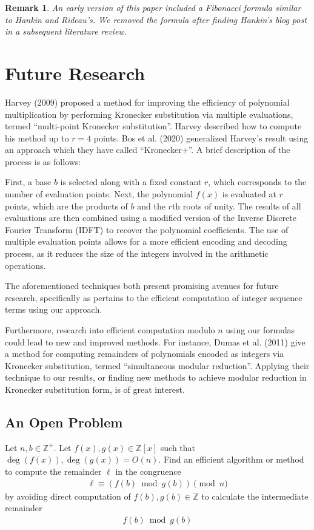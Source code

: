 \documentclass[11pt,reqno]{article}
\theoremstyle{plain}
\newtheorem{remark}{Remark}
\theoremstyle{definition}
\begin{document}
\begin{remark}
An early version of this paper included a Fibonacci formula similar to Hankin and Rideau's. We removed the formula after finding Hankin's blog post in a subsequent literature review.
\end{remark}

\section{Future Research} \label{section:futureresearch}
Harvey (2009) \cite{harvey2009kronecker} proposed a method for improving the efficiency of polynomial multiplication by performing Kronecker substitution via multiple evaluations, termed ``multi-point Kronecker substitution''. Harvey described how to compute his method up to $r=4$ points. Bos et al. (2020) \cite{bos2020postquantum} generalized Harvey's result using an approach which they have called ``Kronecker+''. A brief description of the process is as follows:

First, a base $b$ is selected along with a fixed constant $r$, which corresponds to the number of evaluation points. Next, the polynomial $f(x)$ is evaluated at $r$ points, which are the products of $b$ and the $r$th roots of unity. The results of all evaluations are then combined using a modified version of the Inverse Discrete Fourier Transform (IDFT) to recover the polynomial coefficients. The use of multiple evaluation points allows for a more efficient encoding and decoding process, as it reduces the size of the integers involved in the arithmetic operations.

The aforementioned techniques both present promising avenues for future research, specifically as pertains to the efficient computation of integer sequence terms using our approach.

Furthermore, research into efficient computation modulo $n$ using our formulas could lead to new and improved methods. For instance, Dumas et al. (2011) \cite{dumas2011simulataneous} give a method for computing remainders of polynomials encoded as integers via Kronecker substitution, termed ``simultaneous modular reduction''. Applying their technique to our results, or finding new methods to achieve modular reduction in Kronecker substitution form, is of great interest.

\subsection{An Open Problem}
Let $n,b \in \mathbb{Z}^+$. Let $f(x),g(x) \in \mathbb{Z}[x]$ such that $\deg(f(x)),\deg(g(x)) = O(n)$. Find an efficient algorithm or method to compute the remainder $\ell$ in the congruence
\begin{align*}
    \ell \equiv (f(b) \bmod{g(b)}) \pmod{n}
\end{align*}
by avoiding direct computation of $f(b),g(b) \in \mathbb{Z}$ to calculate the intermediate remainder
\begin{align*}
    f(b) \bmod{g(b)}
\end{align*}
\end{document}
